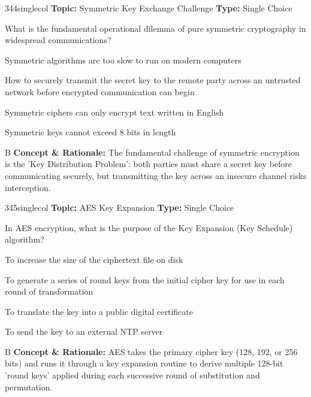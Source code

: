 \begin{qcard}{344}{singlecol}
\textcolor{darkslate!75}{\small\textbf{Topic:} Symmetric Key Exchange Challenge \hfill \textbf{Type:} Single Choice}\vspace{0.4em}\par
What is the fundamental operational dilemma of pure symmetric cryptography in widespread communications?
\begin{qoptions}
\item Symmetric algorithms are too slow to run on modern computers
\item How to securely transmit the secret key to the remote party across an untrusted network before encrypted communication can begin
\item Symmetric ciphers can only encrypt text written in English
\item Symmetric keys cannot exceed 8 bits in length
\end{qoptions}
\end{qcard}
\nopagebreak
\begin{explainbox}{B}
\textbf{Concept \& Rationale:} The fundamental challenge of symmetric encryption is the 'Key Distribution Problem': both parties must share a secret key before communicating securely, but transmitting the key across an insecure channel risks interception.
\end{explainbox}

\begin{qcard}{345}{singlecol}
\textcolor{darkslate!75}{\small\textbf{Topic:} AES Key Expansion \hfill \textbf{Type:} Single Choice}\vspace{0.4em}\par
In AES encryption, what is the purpose of the Key Expansion (Key Schedule) algorithm?
\begin{qoptions}
\item To increase the size of the ciphertext file on disk
\item To generate a series of round keys from the initial cipher key for use in each round of transformation
\item To translate the key into a public digital certificate
\item To send the key to an external NTP server
\end{qoptions}
\end{qcard}
\nopagebreak
\begin{explainbox}{B}
\textbf{Concept \& Rationale:} AES takes the primary cipher key (128, 192, or 256 bits) and runs it through a key expansion routine to derive multiple 128-bit 'round keys' applied during each successive round of substitution and permutation.
\end{explainbox}


